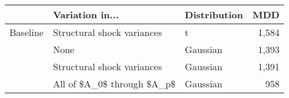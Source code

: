 \begingroup
\fontsize{12.0pt}{14.4pt}\selectfont
\begin{tabular}{lllr}
\toprule
  & Variation in... & Distribution & MDD \\ 
\midrule\addlinespace[2.5pt]
Baseline & Structural shock variances & t & 1,584 \\ 
 & None & Gaussian & 1,393 \\ 
 & Structural shock variances & Gaussian & 1,391 \\ 
 & All of \$A\_0\$ through \$A\_p\$ & Gaussian & 958 \\ 
\bottomrule
\end{tabular}
\endgroup

